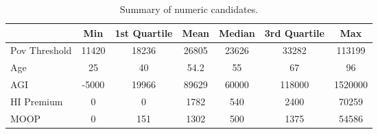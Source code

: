 \begin{table}[h!]
\centering
\begin{tabular}{|l|c|c|c|c|c|c|}
\hline
\rowcolor[HTML]{E7EAF6} 
\multicolumn{1}{|c|}{\textbf{Covariate}} & \multicolumn{1}{c|}{Min} & \multicolumn{1}{c|}{1st Quartile} & \multicolumn{1}{c|}{Mean} & \multicolumn{1}{c|}{Median} & \multicolumn{1}{c|}{3rd Quartile} & \multicolumn{1}{c|}{Max} \\ \hline
Pov Threshold & 11420 & 18236 & 26805 & 23626 & 33282 & 113199 \\ \hline
Age & 25 & 40 & 54.2 & 55 & 67 & 96 \\ \hline
AGI & -5000 & 19966 & 89629 & 60000 & 118000 & 1520000 \\ \hline
HI Premium & 0 & 0 & 1782 & 540 & 2400 & 70259 \\ \hline
MOOP & 0 & 151 & 1302 & 500 & 1375 & 54586 \\ \hline
\end{tabular}
\caption{Summary of numeric candidates.}
\end{table}
